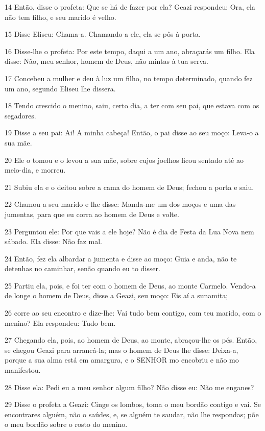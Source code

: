 \par 14 Então, disse o profeta: Que se há de fazer por ela? Geazi respondeu: Ora, ela não tem filho, e seu marido é velho.
\par 15 Disse Eliseu: Chama-a. Chamando-a ele, ela se pôs à porta.
\par 16 Disse-lhe o profeta: Por este tempo, daqui a um ano, abraçarás um filho. Ela disse: Não, meu senhor, homem de Deus, não mintas à tua serva.
\par 17 Concebeu a mulher e deu à luz um filho, no tempo determinado, quando fez um ano, segundo Eliseu lhe dissera.
\par 18 Tendo crescido o menino, saiu, certo dia, a ter com seu pai, que estava com os segadores.
\par 19 Disse a seu pai: Ai! A minha cabeça! Então, o pai disse ao seu moço: Leva-o a sua mãe.
\par 20 Ele o tomou e o levou a sua mãe, sobre cujos joelhos ficou sentado até ao meio-dia, e morreu.
\par 21 Subiu ela e o deitou sobre a cama do homem de Deus; fechou a porta e saiu.
\par 22 Chamou a seu marido e lhe disse: Manda-me um dos moços e uma das jumentas, para que eu corra ao homem de Deus e volte.
\par 23 Perguntou ele: Por que vais a ele hoje? Não é dia de Festa da Lua Nova nem sábado. Ela disse: Não faz mal.
\par 24 Então, fez ela albardar a jumenta e disse ao moço: Guia e anda, não te detenhas no caminhar, senão quando eu to disser.
\par 25 Partiu ela, pois, e foi ter com o homem de Deus, ao monte Carmelo. Vendo-a de longe o homem de Deus, disse a Geazi, seu moço: Eis aí a sunamita;
\par 26 corre ao seu encontro e dize-lhe: Vai tudo bem contigo, com teu marido, com o menino? Ela respondeu: Tudo bem.
\par 27 Chegando ela, pois, ao homem de Deus, ao monte, abraçou-lhe os pés. Então, se chegou Geazi para arrancá-la; mas o homem de Deus lhe disse: Deixa-a, porque a sua alma está em amargura, e o SENHOR mo encobriu e não mo manifestou.
\par 28 Disse ela: Pedi eu a meu senhor algum filho? Não disse eu: Não me enganes?
\par 29 Disse o profeta a Geazi: Cinge os lombos, toma o meu bordão contigo e vai. Se encontrares alguém, não o saúdes, e, se alguém te saudar, não lhe respondas; põe o meu bordão sobre o rosto do menino.
